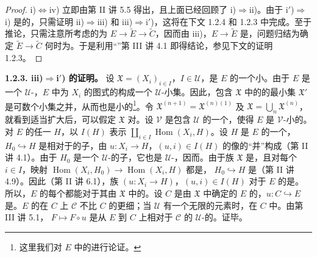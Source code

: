 \begin{proof}
i)$\Leftrightarrow$iv) 立即由第 II 讲 5.5 得出，且上面已经回顾了 i)$\Rightarrow$ii)。由于 i$'$)$\Rightarrow$i) 是的，只需证明 ii)$\Rightarrow$iii) 和 iii)$\Rightarrow$i$'$)，这将在下文 1.2.4 和 1.2.3 中完成。至于推论，只需注意所考虑的为 $E\to\widetilde E\to\widetilde C$，因而由 iii)，$E\to\widetilde E$ 是，问题归结为确定 $\widetilde E\to\widetilde C$ 何时为。于是利用“”第 III 讲 4.1 即得结论，参见下文的证明 1.2.3。
\end{proof}
\textbf{1.2.3. iii)$\Rightarrow$i$'$) 的证明。} 设 $\mathfrak X=(X_i)_{i\in I}$，$I\in\mathcal U$，是 $E$ 的一个小。由于 $E$ 是一个 $\mathcal U$-，$E$ 中为 $X_i$ 的图式的构成一个 $\mathcal U$-小集。因此，包含 $\mathfrak X$ 中的的最小集 $\mathfrak X'$ 是可数个小集之并，从而也是小的\footnote{这里我们对 $E$ 中的进行论证。}。令 $\mathfrak X^{(n+1)}=\mathfrak X^{(n)(1)}$ 及 $\mathfrak X=\bigcup_n\mathfrak X^{(n)}$，就看到适当扩大后，可以假定 $\mathfrak X$ 对。设 $\mathcal V$ 是包含 $\mathcal U$ 的一个，使得 $E$ 是 $\mathcal V$-小的。对 $E$ 的任一 $H$，以 $I(H)$ 表示
 $\coprod_{i\in I}\operatorname{Hom}(X_i,H)$。设 $H$ 是 $E$ 的一个，$H_0\hookrightarrow H$ 是相对于的子，由 $u:X_i\to H$，$(u,i)\in I(H)$ 的像的“并”构成（第 II 讲 4.1）。由于 $H_0$ 是一个 $\mathcal U$-的子，它也是 $\mathcal U$-，因而。由于族 $\mathfrak X$ 是，且对每个 $i\in I$，映射 $\operatorname{Hom}(X_i,H_0)\to\operatorname{Hom}(X_i,H)$ 都是， $H_0\hookrightarrow H$ 是（第 II 讲 4.9）。因此（第 II 讲 6.1），族 $(u:X_i\to H)$，$(u,i)\in I(H)$ 对于 $E$ 的是。所以，$E$ 的每个都能对于其由 $\mathfrak X$ 中的。设 $C$ 是由 $\mathfrak X$ 中确定的 $E$ 的，$u:C\hookrightarrow E$ 是。$E$ 的在 $C$ 上 $\mathscr C$ 不比 $C$ 的更细；当 $\mathcal U$ 有一个无限的元素时，在 $C$ 中。由第 III 讲 5.1， $F\mapsto F\circ u$ 是从 $E$ 到 $C$ 上相对于 $\mathscr C$ 的 $\mathcal U$-的。证毕。

